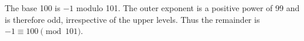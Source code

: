 The base 100 is $-1$ modulo 101. The outer exponent is a positive power of 99 and is therefore odd, irrespective of the upper levels. Thus the remainder is $-1\equiv\boxed{100}\pmod{101}$.
